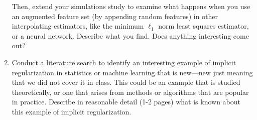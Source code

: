 \documentclass{article}
\begin{document}
\begin{enumerate}[label=(\alph*)]
  Then, extend your simulations study to examine what happens when you use an
  augmented feature set (by appending random features) in other interpolating
  estimators, like the minimum $\ell_1$ norm least squares estimator, or a
  neural network. Describe what you find. Does anything interesting come out?     

\item Conduct a literature search to identify an interesting example of implicit
  regularization in statistics or machine learning that is new---new just
  meaning that we did not cover it in class. This could be an example that is
  studied theoretically, or one that arises from methods or algorithms that are
  popular in practice. Describe in reasonable detail (1-2 pages) what is known
  about this example of implicit regularization.    

\end{enumerate}



\end{document}
